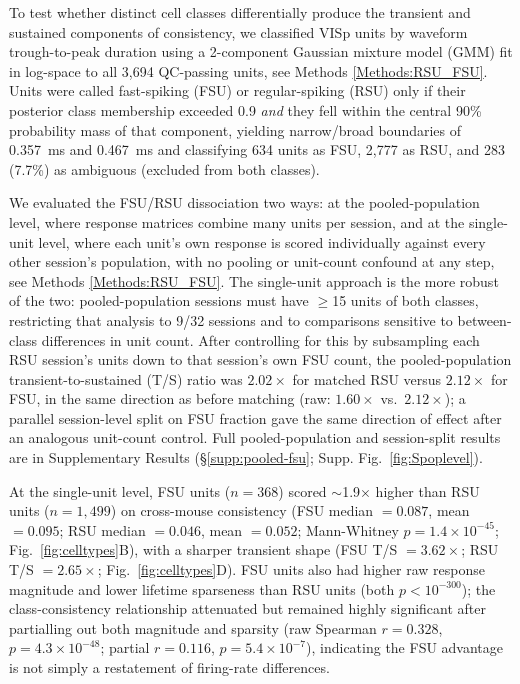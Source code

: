 \documentclass[11pt,onecolumn]{article}
\begin{document}
To test whether distinct cell classes differentially produce the
transient and sustained components of consistency, we classified VISp
units by waveform trough-to-peak duration using a 2-component Gaussian
mixture model (GMM) fit in log-space to all 3,694 QC-passing units, see Methods
\ref{Methods:RSU_FSU}. Units were called fast-spiking (FSU) or regular-spiking (RSU)
only if their posterior class membership exceeded 0.9 \emph{and} they fell
within the central 90\% probability mass of that component, yielding
narrow/broad boundaries of 0.357~ms and 0.467~ms and classifying 634
units as FSU, 2,777 as RSU, and 283 (7.7\%) as ambiguous (excluded from
both classes).

We evaluated the FSU/RSU dissociation two ways: at the pooled-population
level, where response matrices combine many units per session, and at the
single-unit level, where each unit's own response is scored individually
against every other session's population, with no pooling or unit-count
confound at any step, see Methods \ref{Methods:RSU_FSU}. The single-unit 
approach is the more robust of the
two: pooled-population sessions must have $\geq$15 units of both classes,
restricting that analysis to 9/32 sessions and to comparisons sensitive to
between-class differences in unit count. After controlling for this by
subsampling each RSU session's units down to that session's own FSU count,
the pooled-population transient-to-sustained (T/S) ratio was
$2.02\times$ for matched RSU versus $2.12\times$ for FSU, in the same
direction as before matching (raw: $1.60\times$ vs.\ $2.12\times$); a
parallel session-level split on FSU fraction gave the same direction of
effect after an analogous unit-count control. Full pooled-population and
session-split results are in Supplementary Results
(\S\ref{supp:pooled-fsu}; Supp. Fig.~\ref{fig:Spoplevel}).

At the single-unit level, FSU units ($n = 368$) scored $\sim$1.9$\times$
higher than RSU units ($n = 1{,}499$) on cross-mouse consistency (FSU
median $= 0.087$, mean $= 0.095$; RSU median $= 0.046$, mean $= 0.052$;
Mann-Whitney $p = 1.4\times10^{-45}$; Fig.~\ref{fig:celltypes}B), with a
sharper transient shape (FSU T/S $= 3.62\times$; RSU T/S $= 2.65\times$;
Fig.~\ref{fig:celltypes}D). FSU units also had higher raw response
magnitude and lower lifetime sparseness than RSU units (both
$p < 10^{-300}$); the class-consistency relationship attenuated but
remained highly significant after partialling out both magnitude and
sparsity (raw Spearman $r = 0.328$, $p = 4.3\times10^{-48}$; partial
$r = 0.116$, $p = 5.4\times10^{-7}$), indicating the FSU advantage is not
simply a restatement of firing-rate differences.
\end{document}
